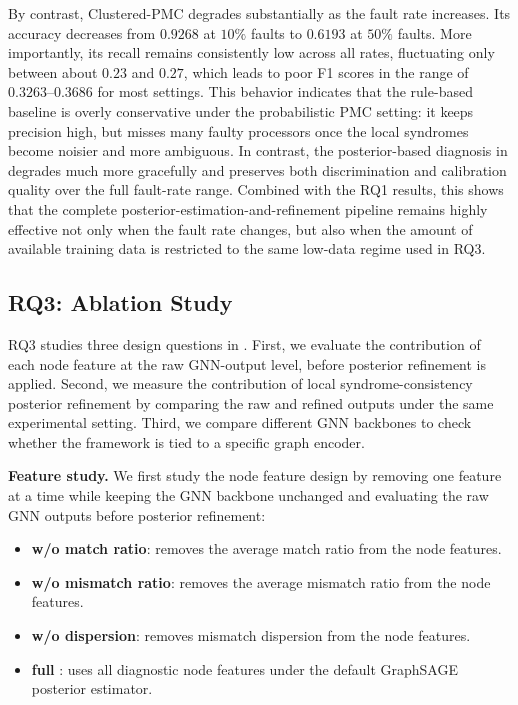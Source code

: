 By contrast, Clustered-PMC degrades substantially as the fault rate increases. Its accuracy decreases from $0.9268$ at $10\%$ faults to $0.6193$ at $50\%$ faults. More importantly, its recall remains consistently low across all rates, fluctuating only between about $0.23$ and $0.27$, which leads to poor F1 scores in the range of $0.3263$--$0.3686$ for most settings. This behavior indicates that the rule-based baseline is overly conservative under the probabilistic PMC setting: it keeps precision high, but misses many faulty processors once the local syndromes become noisier and more ambiguous. In contrast, the posterior-based diagnosis in \tool degrades much more gracefully and preserves both discrimination and calibration quality over the full fault-rate range. Combined with the RQ1 results, this shows that the complete posterior-estimation-and-refinement pipeline remains highly effective not only when the fault rate changes, but also when the amount of available training data is restricted to the same low-data regime used in RQ3.

\subsection{RQ3: Ablation Study}
\label{subsec:rq3_ablation}

RQ3 studies three design questions in \tool. First, we evaluate the contribution of each node feature at the raw GNN-output level, before posterior refinement is applied. Second, we measure the contribution of local syndrome-consistency posterior refinement by comparing the raw and refined outputs under the same experimental setting. Third, we compare different GNN backbones to check whether the framework is tied to a specific graph encoder.

\noindent\textbf{Feature study.}
We first study the node feature design by removing one feature at a time while keeping the GNN backbone unchanged and evaluating the raw GNN outputs before posterior refinement:
\begin{itemize}[leftmargin=*, itemsep=1pt, parsep=0pt, topsep=1pt]
    \item \textbf{w/o match ratio}: removes the average match ratio from the node features.
    \item \textbf{w/o mismatch ratio}: removes the average mismatch ratio from the node features.
    \item \textbf{w/o dispersion}: removes mismatch dispersion from the node features.
    \item \textbf{full \tool}: uses all diagnostic node features under the default GraphSAGE posterior estimator.
\end{itemize}

